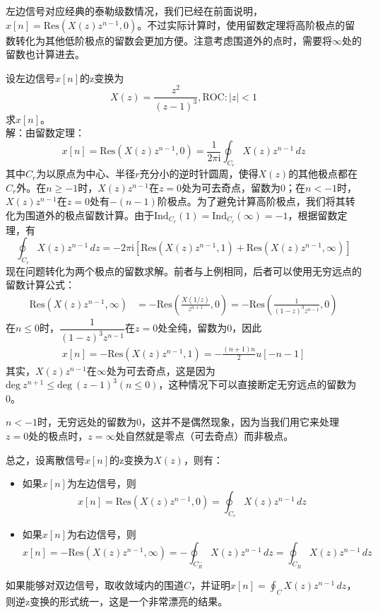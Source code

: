 左边信号对应经典的泰勒级数情况，我们已经在前面说明，$x[n]=\mathrm{Res}\left(X(z)z^{n-1},0\right)$。不过实际计算时，使用留数定理将高阶极点的留数转化为其他低阶极点的留数会更加方便。注意考虑围道外的点时，需要将$\infty$处的留数也计算进去。
\begin{example}
    设左边信号$x[n]$的z变换为
    \[X(z)=\frac{z^2}{(z-1)^3},\mathrm{ROC}:|z|<1\]
    求$x[n]$。\\
    解：由留数定理：
    \[x[n]=\mathrm{Res}\left(X(z)z^{n-1},0\right)=\frac{1}{2\pi \mathrm{i}}\oint_{C_r}X(z)z^{n-1}\,dz\]
    其中$C_r$为以原点为中心、半径$r$充分小的逆时针圆周，使得$X(z)$的其他极点都在$C_r$外。在$n\geq -1$时，$X(z)z^{n-1}$在$z=0$处为可去奇点，留数为0；在$n<-1$时，$X(z)z^{n-1}$在$z=0$处有$-(n-1)$阶极点。为了避免计算高阶极点，我们将其转化为围道外的极点留数计算。由于$\mathrm{Ind}_{C_r}(1)=\mathrm{Ind}_{C_r}(\infty)=-1$，根据留数定理，有
    \[\oint_{C_r}X(z)z^{n-1}\,dz=-2\pi \mathrm{i} \left[\mathrm{Res}\left(X(z)z^{n-1},1\right)+\mathrm{Res}\left(X(z)z^{n-1},\infty\right)\right]\]
    现在问题转化为两个极点的留数求解。前者与上例相同，后者可以使用无穷远点的留数计算公式：
    \begin{align*}
        \mathrm{Res}\left(X(z)z^{n-1},\infty\right)&=-\mathrm{Res}\left(\frac{X(1/z)}{z^{n+1}},0\right)=-\mathrm{Res}\left(\frac{1}{(1-z)^3 z^{n-1}},0\right)
    \end{align*}
    在$n\le 0$时，$\dfrac{1}{(1-z)^3 z^{n-1}}$在$z=0$处全纯，留数为0，因此
    \begin{align*}
        x[n]=-\mathrm{Res}\left(X(z)z^{n-1},1\right)=-\frac{(n+1)n}{2}u[-n-1]
    \end{align*}
    其实，$X(z)z^{n-1}$在$\infty$处为可去奇点，这是因为$\mathrm{deg}\ z^{n+1}\leq \mathrm{deg}\ (z-1)^3(n\le 0)$，这种情况下可以直接断定无穷远点的留数为0。
\end{example}

$n<-1$时，无穷远处的留数为0，这并不是偶然现象，因为当我们用它来处理$z=0$处的极点时，$z=\infty$处自然就是零点（可去奇点）而非极点。

总之，设离散信号$x[n]$的z变换为$X(z)$，则有：
\begin{itemize}
    \item 如果$x[n]$为左边信号，则
    \[x[n]=\mathrm{Res}\left(X(z)z^{n-1},0\right)=\oint_{C_r}X(z)z^{n-1}\,dz\]
    \item 如果$x[n]$为右边信号，则
    \[x[n]=-\mathrm{Res}\left(X(z)z^{n-1},\infty\right)=-\oint_{C^-_R}X(z)z^{n-1}\,dz=\oint_{C_R}X(z)z^{n-1}\,dz\]
\end{itemize}
如果能够对双边信号，取收敛域内的围道$C$，并证明$x[n]=\oint_{C}X(z)z^{n-1}\,dz$，则逆z变换的形式统一，这是一个非常漂亮的结果。

